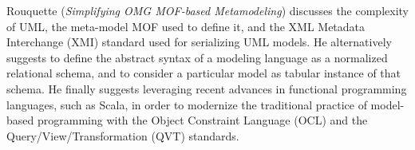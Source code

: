 


Rouquette
\cite{isola-2016-rouquette}
({\em Simplifying OMG MOF-based Metamodeling})
discusses the complexity of UML, the meta-model MOF used to 
define it, and the XML Metadata Interchange (XMI) standard
used for serializing UML models. He alternatively suggests
to define the abstract syntax of a modeling language as 
a normalized relational schema, and to consider a particular
model as tabular instance of that schema. 
He finally suggests leveraging recent advances in functional programming languages, such as Scala, in order 
to modernize the traditional practice of model-based
programming with the Object Constraint Language (OCL) and the
Query/View/Transformation (QVT) standards. 


